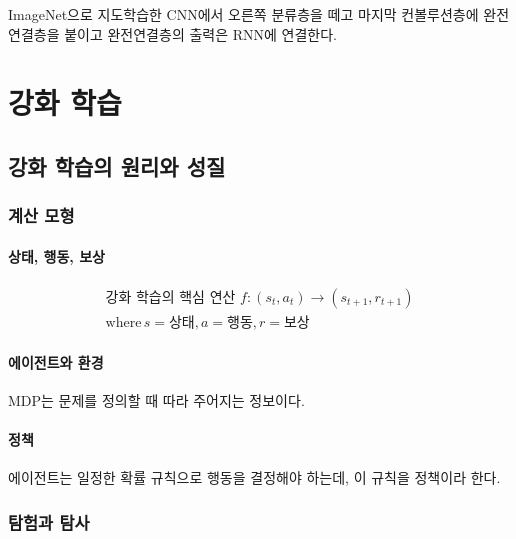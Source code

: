 \documentclass [12pt] {oblivoir}
\let\oldsubsubsection=\subsubsection
\renewcommand{\subsubsection}
{
  \filbreak
  \oldsubsubsection
}
\begin{document}
ImageNet으로 지도학습한 CNN에서 오른쪽 분류층을 떼고 마지막 컨볼루션층에 완전연결층을 붙이고 완전연결층의 출력은 RNN에 연결한다.

\newpage
\section{강화 학습}

\subsection{강화 학습의 원리와 성질}

\subsubsection{계산 모형}

\paragraph*{상태, 행동, 보상}\mbox{}

\begin{align*} \tag{9.1}
  \text{강화 학습의 핵심 연산 } f:(s_{t}, a_{t}) \rightarrow (s_{t+1}, r_{t+1}) \\
  \mathrm{where}\, s = \text{상태}, a = \text{행동}, r = \text{보상}
\end{align*}

\vspace{3mm}

\paragraph*{에이전트와 환경}\mbox{}

MDP는 문제를 정의할 때 따라 주어지는 정보이다.

\vspace{3mm}

\paragraph*{정책}\mbox{}

에이전트는 일정한 확률 규칙으로 행동을 결정해야 하는데, 이 규칙을 정책이라 한다.

\vspace{3mm}

\subsubsection{탐험과 탐사}
\end{document}
